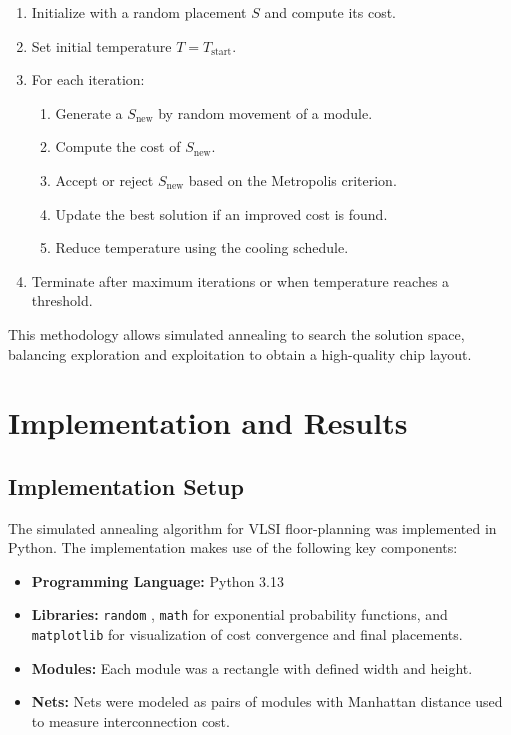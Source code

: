 \documentclass[9pt,a4paper,twoside]{rho-class/rho}
\begin{document}
\begin{enumerate}
    \item Initialize with a random placement $S$ and compute its cost.
    \item Set initial temperature $T = T_{\text{start}}$.
    \item For each iteration:
    \begin{enumerate}
        \item Generate a  $S_{\text{new}}$ by random movement of a module.
        \item Compute the cost of $S_{\text{new}}$.
        \item Accept or reject $S_{\text{new}}$ based on the Metropolis criterion.
        \item Update the best solution if an improved cost is found.
        \item Reduce temperature using the cooling schedule.
    \end{enumerate}
    \item Terminate after maximum iterations or when temperature reaches a threshold.
\end{enumerate}

This methodology allows simulated annealing to search the solution space, balancing exploration and exploitation to obtain a high-quality chip layout.


\section{Implementation and Results}

\subsection{Implementation Setup}
The simulated annealing algorithm for VLSI floor-planning was implemented in Python. The implementation makes use of the following key components:
\begin{itemize}
    \item \textbf{Programming Language:} Python 3.13
    \item \textbf{Libraries:} \texttt{random} , \texttt{math} for exponential probability functions, and \texttt{matplotlib} for visualization of cost convergence and final placements.
    \item \textbf{Modules:} Each module was a rectangle with defined width and height.
    \item \textbf{Nets:} Nets were modeled as pairs of modules with Manhattan distance used to measure interconnection cost.
\end{itemize}
\end{document}
